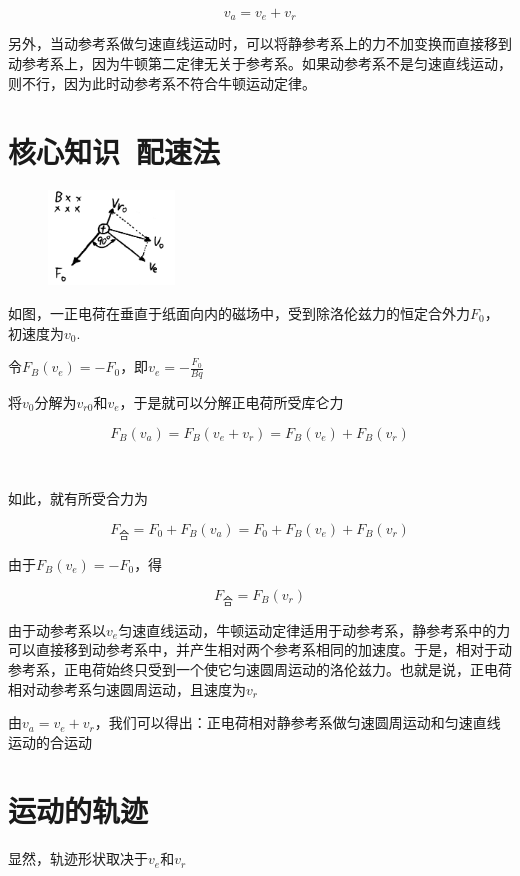 \documentclass[UTF8]{article}
\begin{document}
\[v_{a}=v_{e}+v_{r}\]

另外，当动参考系做匀速直线运动时，可以将静参考系上的力不加变换而直接移到动参考系上，因为牛顿第二定律无关于参考系。如果动参考系不是匀速直线运动，则不行，因为此时动参考系不符合牛顿运动定律。

\section*{核心知识\ 配速法}

\begin{figure}
    \centering
    \includegraphics[width=0.3\textwidth]{vArrange.png}
\end{figure}

如图，一正电荷在垂直于纸面向内的磁场中，受到除洛伦兹力的恒定合外力$F_{0}$，初速度为$v_{0}$.

令$F_{B}(v_{e})=-F_{0}$，即$v_{e}=- \frac{F_{0}}{Bq}$

将$v_{0}$分解为$v_{r0}$和$v_{e}$，于是就可以分解正电荷所受库仑力

\[F_{B}(v_{a})=F_{B}(v_{e}+v_{r})=F_{B}(v_{e})+F_{B}(v_{r})\]

\ 

如此，就有所受合力为

\[F_{\text{合}}=F_{0}+F_{B}(v_{a})=F_{0}+F_{B}(v_{e})+F_{B}(v_{r})\]

由于$F_{B}(v_{e})=-F_{0}$，得

\[F_{\text{合}}=F_{B}(v_{r})\]

由于动参考系以$v_{e}$匀速直线运动，牛顿运动定律适用于动参考系，静参考系中的力可以直接移到动参考系中，并产生相对两个参考系相同的加速度。于是，相对于动参考系，正电荷始终只受到一个使它匀速圆周运动的洛伦兹力。也就是说，正电荷相对动参考系匀速圆周运动，且速度为$v_{r}$

由$v_{a}=v_{e}+v_{r}$，我们可以得出：正电荷相对静参考系做匀速圆周运动和匀速直线运动的合运动

\section*{运动的轨迹}

显然，轨迹形状取决于$v_{e}$和$v_{r}$
\end{document}
